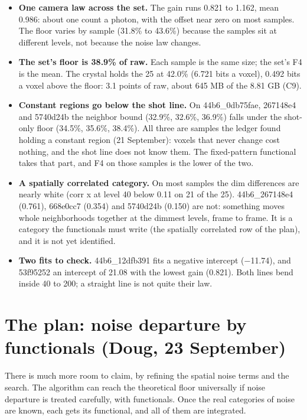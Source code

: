 \begin{itemize}
\item \textbf{One camera law across the set.} The gain runs 0.821 to 1.162, mean 0.986: about one count a photon, with the offset near zero on most samples. The floor varies by sample (31.8\% to 43.6\%) because the samples sit at different levels, not because the noise law changes.
\item \textbf{The set's floor is 38.9\% of raw.} Each sample is the same size; the set's F4 is the mean. The crystal holds the 25 at 42.0\% (6.721 bits a voxel), 0.492 bits a voxel above the floor: 3.1 points of raw, about 645 MB of the 8.81 GB (C9).
\item \textbf{Constant regions go below the shot line.} On 44b6\_\allowbreak{}0db75fae, 267148e4 and 5740d24b the neighbor bound (32.9\%, 32.6\%, 36.9\%) falls under the shot-only floor (34.5\%, 35.6\%, 38.4\%). All three are samples the ledger found holding a constant region (21 September): voxels that never change cost nothing, and the shot line does not know them. The fixed-pattern functional takes that part, and F4 on those samples is the lower of the two.
\item \textbf{A spatially correlated category.} On most samples the dim differences are nearly white (corr x at level 40 below 0.11 on 21 of the 25). 44b6\_\allowbreak{}267148e4 (0.761), 668e0cc7 (0.354) and 5740d24b (0.150) are not: something moves whole neighborhoods together at the dimmest levels, frame to frame. It is a category the functionals must write (the spatially correlated row of the plan), and it is not yet identified.
\item \textbf{Two fits to check.} 44b6\_\allowbreak{}12dfb391 fits a negative intercept (−11.74), and 53f95252 an intercept of 21.08 with the lowest gain (0.821). Both lines bend inside 40 to 200; a straight line is not quite their law.
\end{itemize}

\section{\texorpdfstring{The plan: noise departure by functionals (Doug, 23 September)}{The plan: noise departure by functionals (Doug, 23 September)}}

There is much more room to claim, by refining the spatial noise terms and the search. The algorithm can reach the theoretical floor universally if noise departure is treated carefully, with functionals. Once the real categories of noise are known, each gets its functional, and all of them are integrated.

